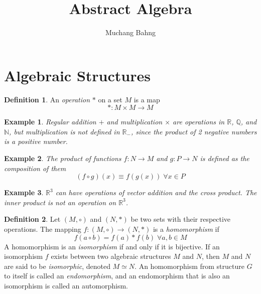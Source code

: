 \documentclass{article}
\newtheorem{example}{Example}[section]
\theoremstyle{remark}
\theoremstyle{definition}
\newtheorem{definition}{Definition}[section]
\begin{document}
\pagestyle{fancy}

\cfoot{\thepage / \pageref{LastPage}}

\title{Abstract Algebra}
\author{Muchang Bahng}

\maketitle

\section{Algebraic Structures}

\begin{definition}
An \textit{operation} $*$ on a set $M$ is a map 
\[ *: M \times M \longrightarrow M \]
\end{definition}

\begin{example}
Regular addition $+$ and multiplication $\times$ are operations in $\mathbb{R}$, $\mathbb{Q}$, and $\mathbb{N}$, but multiplication is not defined in $\mathbb{R_{-}}$, since the product of 2 negative numbers is a positive number. 
\end{example}

\begin{example}
The product of functions $f: N \longrightarrow M$ and $g: P \longrightarrow N$ is defined as the composition of them
\[ (f \circ g)(x) \equiv f(g(x)) \; \forall x\in P \]
\end{example}

\begin{example}
$\mathbb{R}^{3}$ can have operations of vector addition and the cross product. The inner product is \textit{not} an operation on $\mathbb{R}^3$.
\end{example}

\begin{definition}
Let $(M, \circ)$ and $(N, *)$ be two sets with their respective operations. The mapping $f: (M, \circ) \longrightarrow (N, *)$ is a \textit{homomorphism} if
\[f(a \circ b) = f(a) * f(b) \; \forall a, b \in M\]
A homomorphism is an \textit{isomorphism} if and only if it is bijective. If an isomorphism $f$ exists between two algebraic structures $M$ and $N$, then $M$ and $N$ are said to be \textit{isomorphic}, denoted $M \simeq N$. An homomorphism from structure $G$ to itself is called an \textit{endomorphism}, and an endomorphism that is also an isomorphism is called an automorphism. 
\end{definition}
\end{document}
